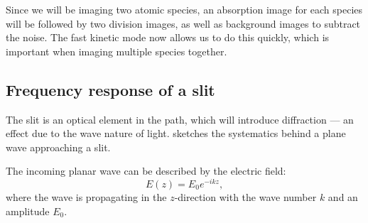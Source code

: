 Since we will be imaging two atomic species, an absorption image for each species will be followed by two division images, as well as background images to subtract the noise. The fast kinetic mode now allows us to do this quickly, which is important when imaging multiple species together.

\subsection{Frequency response of a slit}
\label{subsec:slit}

The slit is an optical element in the path, which will introduce diffraction --- an effect due to the wave nature of light.
 sketches the systematics behind a plane wave approaching a slit.


The incoming planar wave can be described by the electric field:
\begin{equation}
E(z) = E_0 e^{-ikz},
\end{equation}
where the wave is propagating in the $z$-direction with the wave number $k$ and an amplitude $E_0$.

